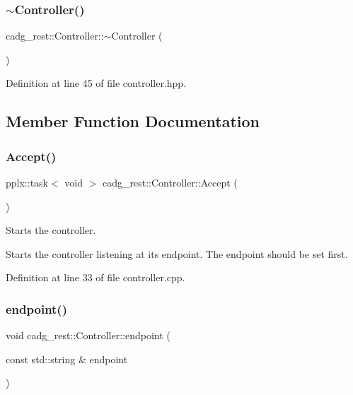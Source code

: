 \subsubsection{\texorpdfstring{$\sim$Controller()}{~Controller()}}
{\footnotesize\ttfamily cadg\+\_\+rest\+::\+Controller\+::$\sim$\+Controller (\begin{DoxyParamCaption}{ }\end{DoxyParamCaption})\hspace{0.3cm}{\ttfamily [inline]}}



Definition at line 45 of file controller.\+hpp.



\subsection{Member Function Documentation}
\mbox{\label{classcadg__rest_1_1_controller_a00ddfc462ff7357cecc6a209f8f9d527}} 
\subsubsection{\texorpdfstring{Accept()}{Accept()}}
{\footnotesize\ttfamily pplx\+::task$<$ void $>$ cadg\+\_\+rest\+::\+Controller\+::\+Accept (\begin{DoxyParamCaption}{ }\end{DoxyParamCaption})}



Starts the controller. 

Starts the controller listening at it\textquotesingle{}s endpoint. The endpoint should be set first. 

Definition at line 33 of file controller.\+cpp.

\mbox{\label{classcadg__rest_1_1_controller_ac467633f4d51e3187bd90380a67cb0d9}} 
\subsubsection{\texorpdfstring{endpoint()}{endpoint()}\hspace{0.1cm}{\footnotesize\ttfamily [1/2]}}
{\footnotesize\ttfamily void cadg\+\_\+rest\+::\+Controller\+::endpoint (\begin{DoxyParamCaption}\item[{const std\+::string \&}]{endpoint }\end{DoxyParamCaption})}




